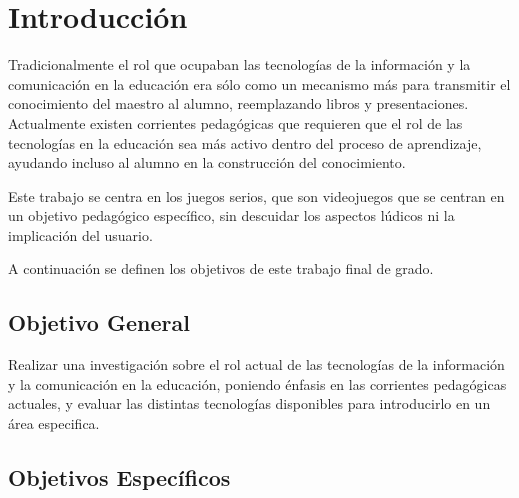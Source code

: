 \section{Introducción}

Tradicionalmente el rol que ocupaban las tecnologías de la información y la
comunicación en la educación era sólo como un mecanismo más para transmitir el
conocimiento del maestro al alumno, reemplazando libros y
presentaciones\cite{laptop:instructionism}. Actualmente existen corrientes
pedagógicas que requieren que el rol de las tecnologías en la educación sea más
activo dentro del proceso de aprendizaje, ayudando incluso al alumno en la
construcción del conocimiento.

Este trabajo se centra en los juegos serios, que son videojuegos que se centran
en un objetivo pedagógico específico, sin descuidar los aspectos lúdicos ni la
implicación del usuario\cite{sg:aoverview,ludus:sg}.
 
A continuación se definen los objetivos de este trabajo final de grado.

\subsection{Objetivo General}

Realizar una investigación sobre el rol actual de las tecnologías de la
información y la comunicación en la educación, poniendo énfasis en las 
corrientes pedagógicas actuales, y evaluar las distintas tecnologías 
disponibles para introducirlo en un área especifica.

\subsection{Objetivos Específicos}

